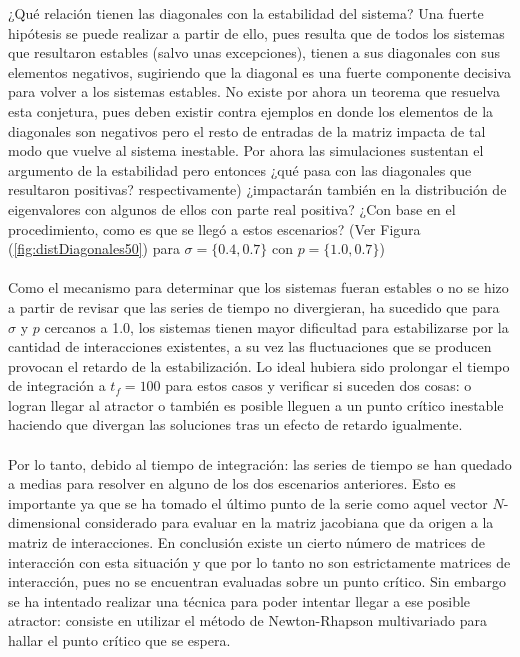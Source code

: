 ¿Qué relación tienen las diagonales con la estabilidad del sistema? Una fuerte hipótesis se puede realizar a partir de ello, pues resulta que de todos los sistemas que resultaron estables (salvo unas excepciones), tienen a sus diagonales con sus elementos negativos, sugiriendo que la diagonal es una fuerte componente decisiva para volver a los sistemas estables. No existe por ahora un teorema que resuelva esta conjetura, pues deben existir contra ejemplos en donde los elementos de la diagonales son negativos pero el resto de entradas de la matriz impacta de tal modo que vuelve al sistema inestable. Por ahora las simulaciones sustentan el argumento de la estabilidad pero entonces ¿qué pasa con las diagonales que resultaron positivas?  respectivamente) ¿impactarán también en la distribución de eigenvalores con algunos de ellos con parte real positiva? ¿Con base en el procedimiento, como es que se llegó a estos escenarios? (Ver Figura (\ref{fig:distDiagonales50}) para $\sigma=\{0.4,0.7\}$ con $p=\{1.0,0.7\}$)\\
\\
Como el mecanismo para determinar que los sistemas fueran estables o no se hizo a partir de revisar que las series de tiempo no divergieran, ha sucedido que para $\sigma$ y $p$ cercanos a 1.0, los sistemas tienen mayor dificultad para estabilizarse por la cantidad de interacciones existentes, a su vez las fluctuaciones que se producen provocan el retardo  de la estabilización. Lo ideal hubiera sido prolongar el tiempo de integración a $t_f=100$ para estos casos y verificar si suceden dos cosas: o logran llegar al atractor o también es posible lleguen a un punto crítico inestable haciendo que divergan las soluciones tras un efecto de retardo igualmente. \\
\\
Por lo tanto, debido al tiempo de integración: las series de tiempo se han quedado a medias para resolver en alguno de los dos escenarios anteriores. Esto es importante ya que se ha tomado el último punto de la serie como aquel vector $N$-dimensional considerado para evaluar en la matriz jacobiana que da origen a la matriz de interacciones. En conclusión existe un cierto número de matrices de interacción con esta situación y que por lo tanto no son estrictamente matrices de interacción, pues no  se encuentran evaluadas sobre un punto crítico. Sin embargo se ha intentado realizar una técnica para poder intentar llegar a ese posible atractor: consiste en utilizar el método de Newton-Rhapson multivariado para hallar el punto crítico que se espera.\\
